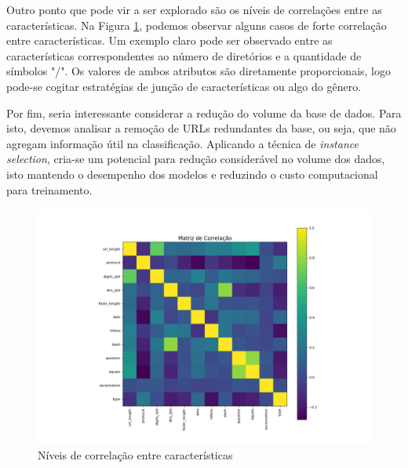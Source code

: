 \documentclass[manuscript,screen,review]{acmart}
\begin{document}
Outro ponto que pode vir a ser explorado são os níveis de correlações entre as características. Na Figura \ref{fig:exampleFig4}, podemos observar alguns casos de forte correlação entre características. Um exemplo claro pode ser observado entre as características correspondentes ao número de diretórios e a quantidade de símbolos "/". Os valores de ambos atributos são diretamente proporcionais, logo pode-se cogitar estratégias de junção de características ou algo do gênero.

Por fim, seria interessante considerar a redução do volume da base de dados. Para isto, devemos analisar a remoção de URLs redundantes da base, ou seja, que não agregam informação útil na classificação. Aplicando a técnica de \emph{instance selection}, cria-se um potencial para redução considerável no volume dos dados, isto mantendo o desempenho dos modelos e reduzindo o custo computacional para treinamento.

\begin{figure}[H]
    \centering
    \vspace*{-0.4cm}
    \includegraphics[width=1.1\textwidth]{pic/corr.pdf}
    \vspace*{-1.15cm}
    \caption{Níveis de correlação entre características}
    \label{fig:exampleFig4}
\end{figure}
\vspace*{-0.5cm}



\end{document}
